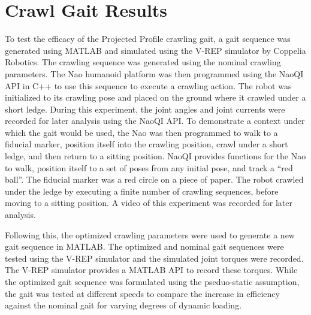 \chapter{Crawl Gait Results} \label{ch:results_crawl_gait}


To test the efficacy of the Projected Profile crawling gait, a gait sequence was generated
using MATLAB and simulated using the V-REP simulator by Coppelia Robotics.
The crawling sequence was generated using the nominal crawling parameters. 
The Nao humanoid platform was then programmed using the NaoQI API in C++ to use this sequence 
to execute a crawling action. The robot was initialized to its crawling pose and placed on the 
ground where it crawled under a short ledge. During this experiment, the joint angles and joint
currents were recorded for later analysis using the NaoQI API.
To demonstrate a context under which the gait 
would be used, the Nao was then programmed to walk to a fiducial marker, position itself into
the crawling position, crawl under a short ledge, and then return to a sitting position.
NaoQI provides functions for the Nao to walk, position itself to a set of poses from any initial
pose, and track a ``red ball''. The fiducial marker was a red circle on a piece of paper.
The robot crawled under the ledge by executing a finite number of crawling sequences, before
moving to a sitting position. A video of this experiment was recorded for later analysis.

Following this, the optimized crawling parameters were used to generate a new gait sequence in
MATLAB. The optimized and nominal gait sequences were tested using the V-REP simulator and the simulated
joint torques were recorded. The V-REP simulator provides a MATLAB API to record these torques.
While the optimized gait sequence was formulated using the pseduo-static assumption,
the gait was tested at different speeds to compare the increase in efficiency against the nominal
gait for varying degrees of dynamic loading.

